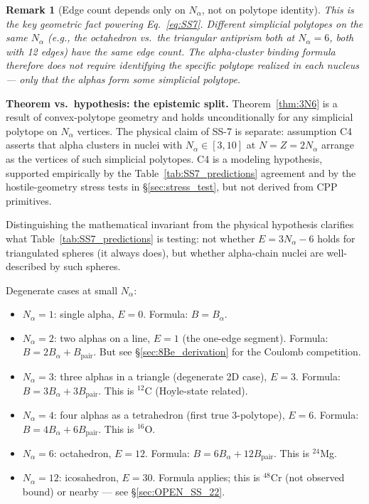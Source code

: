 \documentclass[11pt,letterpaper]{article}
\newtheorem{remark}[theorem]{Remark}
\newcommand{\Bpair}{B_{\mathrm{pair}}}
\newcommand{\Balpha}{B_{\alpha}}
\newcommand{\Nalpha}{N_{\alpha}}
\begin{document}
\begin{remark}[Edge count depends only on $\Nalpha$, not on polytope identity]
\label{rem:universal}
This is the key geometric fact powering Eq.~\ref{eq:SS7}. Different simplicial polytopes on the same $\Nalpha$ (e.g., the octahedron vs.~the triangular antiprism both at $\Nalpha = 6$, both with 12 edges) have the same edge count. The alpha-cluster binding formula therefore does not require identifying the specific polytope realized in each nucleus --- only that the alphas form \emph{some} simplicial polytope.
\end{remark}

\begin{mdframed}[backgroundcolor=yellow!10, linewidth=0.8pt]
\textbf{Theorem vs.~hypothesis: the epistemic split.} Theorem~\ref{thm:3N6} is a result of convex-polytope geometry and holds unconditionally for any simplicial polytope on $\Nalpha$ vertices. The physical claim of SS-7 is separate: assumption C4 asserts that alpha clusters in nuclei with $\Nalpha \in [3, 10]$ at $N = Z = 2\Nalpha$ arrange as the vertices of such simplicial polytopes. C4 is a modeling hypothesis, supported empirically by the Table~\ref{tab:SS7_predictions} agreement and by the hostile-geometry stress tests in \S\ref{sec:stress_test}, but not derived from CPP primitives.

Distinguishing the mathematical invariant from the physical hypothesis clarifies what Table~\ref{tab:SS7_predictions} is testing: not whether $E = 3\Nalpha - 6$ holds for triangulated spheres (it always does), but whether alpha-chain nuclei are well-described by such spheres.
\end{mdframed}

Degenerate cases at small $\Nalpha$:
\begin{itemize}
\item $\Nalpha = 1$: single alpha, $E = 0$. Formula: $B = \Balpha$.
\item $\Nalpha = 2$: two alphas on a line, $E = 1$ (the one-edge segment). Formula: $B = 2\Balpha + \Bpair$. But see §\ref{sec:8Be_derivation} for the Coulomb competition.
\item $\Nalpha = 3$: three alphas in a triangle (degenerate 2D case), $E = 3$. Formula: $B = 3\Balpha + 3\Bpair$. This is ${}^{12}$C (Hoyle-state related).
\item $\Nalpha = 4$: four alphas as a tetrahedron (first true 3-polytope), $E = 6$. Formula: $B = 4\Balpha + 6\Bpair$. This is ${}^{16}$O.
\item $\Nalpha = 6$: octahedron, $E = 12$. Formula: $B = 6\Balpha + 12\Bpair$. This is ${}^{24}$Mg.
\item $\Nalpha = 12$: icosahedron, $E = 30$. Formula applies; this is ${}^{48}$Cr (not observed bound) or nearby --- see §\ref{sec:OPEN_SS_22}.
\end{itemize}
\end{document}
